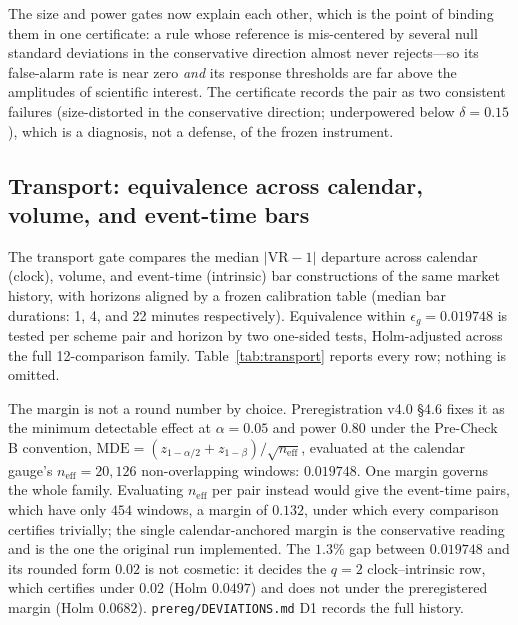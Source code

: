 \documentclass[3p]{elsarticle}
\newcommand{\VR}{\ensuremath{\mathrm{VR}}}
\newcommand{\epsg}{\ensuremath{\epsilon_g}}
\begin{document}
The size and power gates now explain each other, which is the point of
binding them in one certificate: a rule whose reference is mis-centered by
several null standard deviations in the conservative direction almost never
rejects---so its false-alarm rate is near zero \emph{and} its response
thresholds are far above the amplitudes of scientific interest. The
certificate records the pair as two consistent failures (size-distorted in
the conservative direction; underpowered below $\delta=0.15$), which is a
diagnosis, not a defense, of the frozen instrument.

\subsection{Transport: equivalence across calendar, volume, and event-time bars}
\label{sec:transport}

The transport gate compares the median $|\VR-1|$ departure across calendar
(clock), volume, and event-time (intrinsic) bar constructions of the same
market history, with horizons aligned by a frozen calibration table (median
bar durations: 1, 4, and 22 minutes respectively). Equivalence within
$\epsg=0.019748$ is tested per scheme pair and horizon by two one-sided tests,
Holm-adjusted across the full 12-comparison family. Table~\ref{tab:transport}
reports every row; nothing is omitted.

The margin is not a round number by choice. Preregistration v4.0 §4.6 fixes it
as the minimum detectable effect at $\alpha=0.05$ and power $0.80$ under the
Pre-Check B convention, $\mathrm{MDE}=(z_{1-\alpha/2}+z_{1-\beta})/
\sqrt{n_{\mathrm{eff}}}$, evaluated at the calendar gauge's
$n_{\mathrm{eff}}=20{,}126$ non-overlapping windows: $0.019748$. One margin
governs the whole family. Evaluating $n_{\mathrm{eff}}$ per pair instead would
give the event-time pairs, which have only $454$ windows, a margin of $0.132$,
under which every comparison certifies trivially; the single calendar-anchored
margin is the conservative reading and is the one the original run
implemented. The $1.3\%$ gap between $0.019748$ and its rounded form $0.02$ is
not cosmetic: it decides the $q{=}2$ clock--intrinsic row, which certifies
under $0.02$ (Holm $0.0497$) and does not under the preregistered margin (Holm
$0.0682$). \texttt{prereg/DEVIATIONS.md} D1 records the full history.
\end{document}
